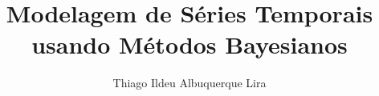 \documentclass[12pt,twoside,english,brazil]{book}
\title{Modelagem de Séries  Temporais usando Métodos Bayesianos}
\author{Thiago Ildeu Albuquerque Lira}
\begin{document}


\frontmatter



\par



\mainmatter


\par



\appendix
\end{document}
